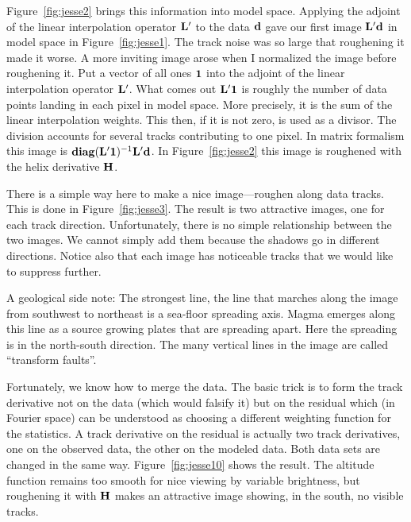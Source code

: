 \par
Figure~\ref{fig:jesse2} brings this information into model space.
Applying the adjoint of the linear interpolation operator $\bold L'$
to the data $\bold d$ gave our first image $\bold L'\bold d$
in model space in Figure~\ref{fig:jesse1}.
The track noise was so large that roughening it made it worse.
A more inviting image arose when I normalized the image before roughening it.
Put a vector of all ones $\bold 1$ into the
adjoint of the linear interpolation operator $\bold L'$.
What comes out $\bold L'\bold 1$
is roughly the number of data points landing in each pixel in model space.
More precisely, it is the sum of the linear interpolation weights.
This then, if it is not zero, is used as a divisor.
The division accounts for several tracks contributing to one pixel.
In matrix formalism this image is
${\bf diag}(\bold L'\bold 1)^{-1} \bold L'\bold d$.
In Figure~\ref{fig:jesse2} this image is roughened
with the helix derivative $\bold H$.


\par
There is a simple way here to make a nice image---roughen
along data tracks.
This is done in
Figure~\ref{fig:jesse3}.
The result is two attractive images, one for each track direction.
Unfortunately, there is no simple relationship between the two images.
We cannot simply add them because the shadows go in different directions.
Notice also that each image has noticeable tracks that we would
like to suppress further.
\par
A geological side note:
The strongest line, the line that marches along the image from
southwest to northeast is a sea-floor spreading axis.
Magma emerges along this line
as a source growing plates that are spreading apart.
Here the spreading is in the north-south direction.
The many vertical lines in the image are called ``transform faults''.

\par
Fortunately, we know how to merge the data.
The basic trick is to form the track derivative
not on the data (which would falsify it)
but on the residual which
(in Fourier space) can be understood as
choosing a different weighting function for the statistics.
A track derivative on the residual is actually two track derivatives,
one on the observed data, the other on the modeled data.
Both data sets are changed in the same way.
Figure~\ref{fig:jesse10} shows the result.
The altitude function remains too smooth for nice viewing
by variable brightness,
but roughening it with $\bold H$ makes an attractive image
showing, in the south, no visible tracks.


